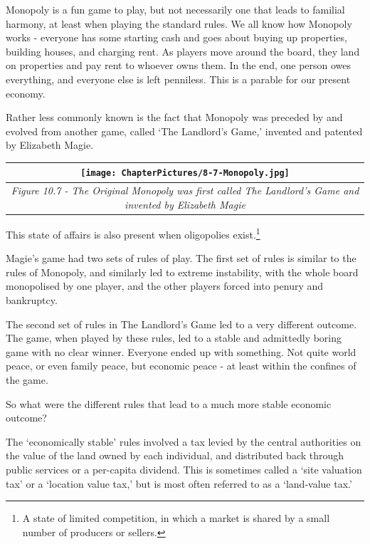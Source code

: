 \documentclass[]{tufte-handout}
\begin{document}
Monopoly is a fun game to play, but not necessarily one that leads to
familial harmony, at least when playing the standard rules. We all know
how Monopoly works - everyone has some starting cash and goes about
buying up properties, building houses, and charging rent. As players
move around the board, they land on properties and pay rent to whoever
owns them. In the end, one person owes everything, and everyone else is
left penniless. This is a parable for our present economy.

Rather less commonly known is the fact that Monopoly was preceded by and
evolved from another game, called `The Landlord's Game,' invented and
patented by Elizabeth Magie.

\begin{longtable}[]{@{}c@{}}
\toprule
\begin{minipage}[b]{0.97\columnwidth}\centering
\texttt{[image: ChapterPictures/8-7-Monopoly.jpg]}\strut
\end{minipage}\tabularnewline
\midrule
\endhead
\begin{minipage}[t]{0.97\columnwidth}\centering
\emph{Figure 10.7 - The Original Monopoly was first called The
Landlord's Game and invented by Elizabeth Magie}\strut
\end{minipage}\tabularnewline
\bottomrule
\end{longtable}

This state of affairs is also present when oligopolies exist.\footnote{A
  state of limited competition, in which a market is shared by a small
  number of producers or sellers.}

Magie's game had two sets of rules of play. The first set of rules is
similar to the rules of Monopoly, and similarly led to extreme
instability, with the whole board monopolised by one player, and the
other players forced into penury and bankruptcy.

The second set of rules in The Landlord's Game led to a very different
outcome. The game, when played by these rules, led to a stable and
admittedly boring game with no clear winner. Everyone ended up with
something. Not quite world peace, or even family peace, but economic
peace - at least within the confines of the game.

So what were the different rules that lead to a much more stable
economic outcome?

The `economically stable' rules involved a tax levied by the central
authorities on the value of the land owned by each individual, and
distributed back through public services or a per-capita dividend. This
is sometimes called a `site valuation tax' or a `location value tax,'
but is most often referred to as a `land-value tax.'
\end{document}
